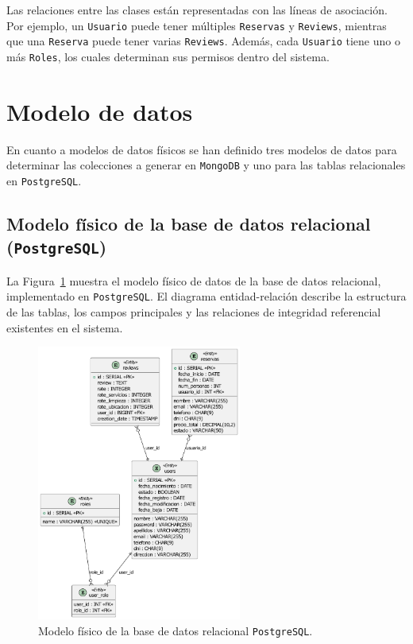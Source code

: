 Las relaciones entre las clases están representadas con las líneas de asociación. Por ejemplo, un \texttt{Usuario} puede tener múltiples \texttt{Reservas} y \texttt{Reviews}, mientras que una \texttt{Reserva} puede tener varias \texttt{Reviews}. Además, cada \texttt{Usuario} tiene uno o más \texttt{Roles}, los cuales determinan sus permisos dentro del sistema.

\section{Modelo de datos}

En cuanto a modelos de datos físicos se han definido tres modelos de datos para determinar las colecciones a generar en \texttt{MongoDB} y uno para las tablas relacionales en \texttt{PostgreSQL}. 

\subsection{Modelo físico de la base de datos relacional (\texttt{PostgreSQL})}

La Figura~\ref{fig:modelo_datos_postgres} muestra el modelo físico de datos de la base de datos relacional, implementado en \texttt{PostgreSQL}. El diagrama entidad-relación describe la estructura de las tablas, los campos principales y las relaciones de integridad referencial existentes en el sistema.

\begin{figure}[h!tb]
\centering
\includegraphics[width=0.6\textwidth]{figs/pg_sifico.pdf}
\caption{Modelo físico de la base de datos relacional \texttt{PostgreSQL}.\label{fig:modelo_datos_postgres}}
\end{figure}

